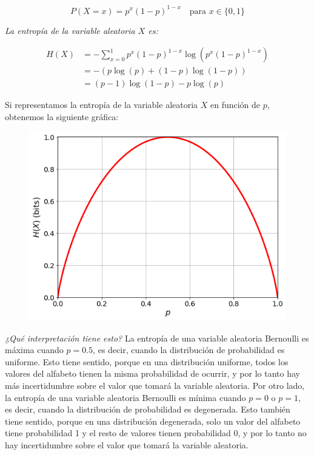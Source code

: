 \[
P(X=x) = p^x(1-p)^{1-x} \quad \text{para } x\in\{0,1\}
\]

\emph{La entropía de la variable aleatoria \(X\) es:}


\begin{align*}
H(X) &= -\sum_{x=0}^1 p^x(1-p)^{1-x}\log\left(p^x(1-p)^{1-x}\right) \\
&= -\left(p\log(p) + (1-p)\log(1-p)\right) \\
&= (p-1)\log(1-p) -p\log(p)
\end{align*}

Si representamos la entropía de la variable aleatoria \(X\) en función
de \(p\), obtenemos la siguiente gráfica:

\begin{figure}[htbp!]
\centering
\includegraphics[width=0.95\linewidth]{./img/bernoulli_entropy.png}
\end{figure}

\emph{¿Qué interpretación tiene esto?} La entropía de una variable
aleatoria Bernoulli es máxima cuando \(p=0.5\), es decir, cuando la
distribución de probabilidad es uniforme. Esto tiene sentido, porque en
una distribución uniforme, todos los valores del alfabeto tienen la
misma probabilidad de ocurrir, y por lo tanto hay más incertidumbre
sobre el valor que tomará la variable aleatoria. Por otro lado, la
entropía de una variable aleatoria Bernoulli es mínima cuando \(p=0\) o
\(p=1\), es decir, cuando la distribución de probabilidad es degenerada.
Esto también tiene sentido, porque en una distribución degenerada, solo
un valor del alfabeto tiene probabilidad 1 y el resto de valores tienen
probabilidad 0, y por lo tanto no hay incertidumbre sobre el valor que
tomará la variable aleatoria.

